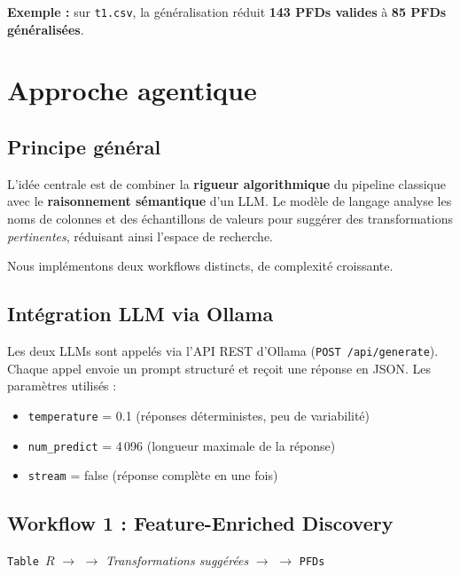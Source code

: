 \documentclass[12pt,a4paper]{article}
\begin{document}
\textbf{Exemple :} sur \texttt{t1.csv}, la g\'{e}n\'{e}ralisation r\'{e}duit \textbf{143 PFDs valides} \`{a} \textbf{85 PFDs g\'{e}n\'{e}ralis\'{e}es}.

\section{Approche agentique}
\label{sec:agentique}

\subsection{Principe g\'{e}n\'{e}ral}

L'id\'{e}e centrale est de combiner la \textbf{rigueur algorithmique} du pipeline classique avec le \textbf{raisonnement s\'{e}mantique} d'un LLM. Le mod\`{e}le de langage analyse les noms de colonnes et des \'{e}chantillons de valeurs pour sugg\'{e}rer des transformations \textit{pertinentes}, r\'{e}duisant ainsi l'espace de recherche.

Nous impl\'{e}mentons deux workflows distincts, de complexit\'{e} croissante.

\subsection{Int\'{e}gration LLM via Ollama}

Les deux LLMs sont appel\'{e}s via l'API REST d'Ollama (\texttt{POST /api/generate}). Chaque appel envoie un prompt structur\'{e} et re\c{c}oit une r\'{e}ponse en JSON. Les param\`{e}tres utilis\'{e}s :
\begin{itemize}
    \item \texttt{temperature} = 0.1 (r\'{e}ponses d\'{e}terministes, peu de variabilit\'{e})
    \item \texttt{num\_predict} = 4\,096 (longueur maximale de la r\'{e}ponse)
    \item \texttt{stream} = false (r\'{e}ponse compl\`{e}te en une fois)
\end{itemize}

\subsection{Workflow 1 : Feature-Enriched Discovery}

\begin{tcolorbox}[colback=blue!5!white, colframe=blue!50!black, title=Workflow 1 -- Feature-Enriched Discovery]
\begin{center}
\texttt{Table $R$} $\rightarrow$  $\rightarrow$ \textit{Transformations sugg\'{e}r\'{e}es} $\rightarrow$  $\rightarrow$ \texttt{PFDs}
\end{center}
\end{tcolorbox}
\end{document}
